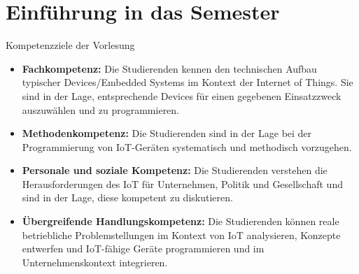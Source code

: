 

\section{Einführung in das Semester}

\begin{frame}{Kompetenzziele der Vorlesung}
    \begin{itemize}
        \item \textbf{Fachkompetenz:} Die Studierenden kennen den technischen Aufbau typischer
        Devices/Embedded Systems im Kontext der Internet of Things. Sie sind in der Lage,
        entsprechende Devices für einen gegebenen Einsatzzweck auszuwählen und zu programmieren.
        \medskip

        \item \textbf{Methodenkompetenz:} Die Studierenden sind in der Lage bei der Programmierung
        von IoT-Geräten systematisch und methodisch vorzugehen.
        \medskip

        \item \textbf{Personale und soziale Kompetenz:} Die Studierenden verstehen die Herausforderungen
        des IoT für Unternehmen, Politik und Gesellschaft und sind in der Lage, diese kompetent zu diskutieren.
        \medskip

        \item \textbf{Übergreifende Handlungskompetenz:} Die Studierenden können reale betriebliche
        Problemstellungen im Kontext von IoT analysieren, Konzepte entwerfen und IoT-fähige Geräte
        programmieren und im Unternehmenskontext integrieren.
        \medskip
    \end{itemize}
\end{frame}

